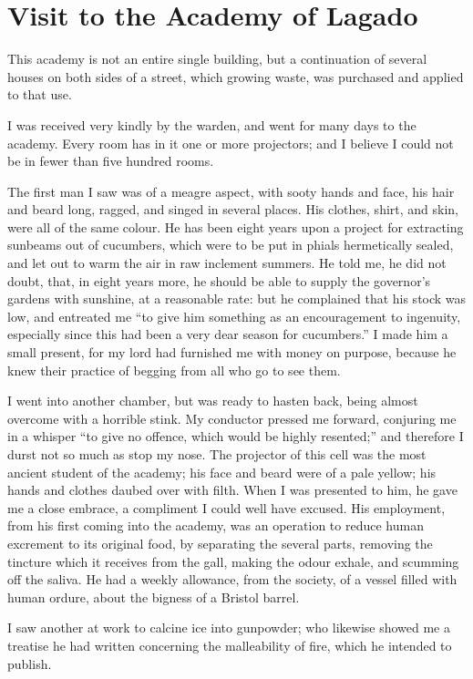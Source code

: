 \section{Visit to the Academy of Lagado}

This academy is not an entire single building, but a continuation of several houses on both sides of a street, which growing waste, was purchased and applied to that use.


I was received very kindly by the warden, and went for many days to the academy.  Every room has in it one or more projectors; and I believe I could not be in fewer than five hundred rooms.

The first man I saw was of a meagre aspect, with sooty hands and face, his hair and beard long, ragged, and singed in several places.  His clothes, shirt, and skin, were all of the same colour.  He has been eight years upon a project for extracting sunbeams out of cucumbers, which were to be put in phials hermetically sealed, and let out to warm the air in raw inclement summers.  He told me, he did not doubt, that, in eight years more, he should be able to supply the governor’s gardens with sunshine, at a reasonable rate: but he complained that his stock was low, and entreated me “to give him something as an encouragement to ingenuity, especially since this had been a very dear season for cucumbers.”  I made him a small present, for my lord had furnished me with money on purpose, because he knew their practice of begging from all who go to see them.

I went into another chamber, but was ready to hasten back, being almost overcome with a horrible stink.  My conductor pressed me forward, conjuring me in a whisper “to give no offence, which would be highly resented;” and therefore I durst not so much as stop my nose.  The projector of this cell was the most ancient student of the academy; his face and beard were of a pale yellow; his hands and clothes daubed over with filth.  When I was presented to him, he gave me a close embrace, a compliment I could well have excused.  His employment, from his first coming into the academy, was an operation to reduce human excrement to its original food, by separating the several parts, removing the tincture which it receives from the gall, making the odour exhale, and scumming off the saliva.  He had a weekly allowance, from the society, of a vessel filled with human ordure, about the bigness of a Bristol barrel.

I saw another at work to calcine ice into gunpowder; who likewise showed me a treatise he had written concerning the malleability of fire, which he intended to publish.

